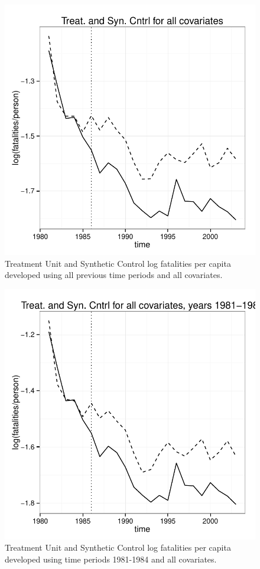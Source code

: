 \documentclass[letterpaper, 12pt]{article}
\begin{document}
\begin{figure}[htbp]
\begin{center}
\includegraphics{img-split-full.pdf}
\caption{Treatment Unit and Synthetic Control log fatalities per capita developed using all previous time periods and all covariates.}
\label{fig:c14}
\end{center}
\end{figure}

\begin{figure}[htbp]
\begin{center}
\includegraphics{img-split-full1984.pdf}
\caption{Treatment Unit and Synthetic Control log fatalities per capita developed using time periods 1981-1984 and all covariates.}
\label{fig:c15}
\end{center}
\end{figure}
\end{document}

